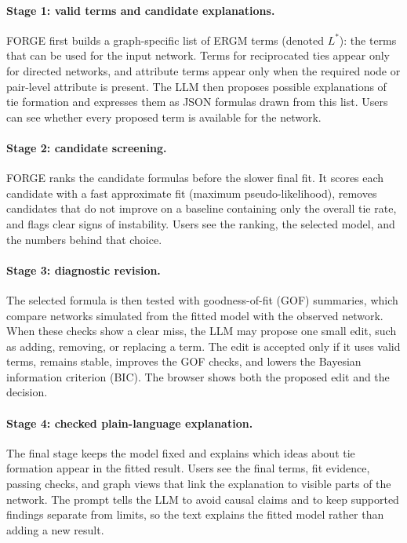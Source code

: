 \documentclass[11pt]{article}
\begin{document}
\paragraph{Stage 1: valid terms and candidate explanations.}
FORGE first builds a graph-specific list of ERGM terms (denoted $L^{*}$): the terms that can be used for the input network. Terms for reciprocated ties appear only for directed networks, and attribute terms appear only when the required node or pair-level attribute is present. The LLM then proposes possible explanations of tie formation and expresses them as JSON formulas drawn from this list. Users can see whether every proposed term is available for the network.

\paragraph{Stage 2: candidate screening.}
FORGE ranks the candidate formulas before the slower final fit. It scores each candidate with a fast approximate fit (maximum pseudo-likelihood), removes candidates that do not improve on a baseline containing only the overall tie rate, and flags clear signs of instability. Users see the ranking, the selected model, and the numbers behind that choice.

\paragraph{Stage 3: diagnostic revision.}
The selected formula is then tested with goodness-of-fit (GOF) summaries, which compare networks simulated from the fitted model with the observed network. When these checks show a clear miss, the LLM may propose one small edit, such as adding, removing, or replacing a term. The edit is accepted only if it uses valid terms, remains stable, improves the GOF checks, and lowers the Bayesian information criterion (BIC). The browser shows both the proposed edit and the decision.

\paragraph{Stage 4: checked plain-language explanation.}
The final stage keeps the model fixed and explains which ideas about tie formation appear in the fitted result. Users see the final terms, fit evidence, passing checks, and graph views that link the explanation to visible parts of the network. The prompt tells the LLM to avoid causal claims and to keep supported findings separate from limits, so the text explains the fitted model rather than adding a new result.
\end{document}
